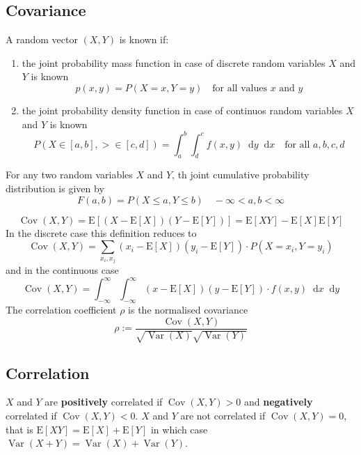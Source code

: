 \documentclass[11pt]{article}
\theoremstyle{definition}
\newcommand*\ev[1]{\mathrel{\text{E}\left[#1\right]}}
\newcommand*\diff{\mathop{}\!\mathrm{d}}
\newcommand*\Cov[1]{\mathop{\text{Cov}}\left(#1\right)}
\newcommand*\Var[1]{\mathop{\text{Var}}\left(#1\right)}
\begin{document}
\subsection{Covariance}
A random vector $(X,Y)$ is known if:
\begin{enumerate}[label=(\alph*)]
	\item the joint probability mass function in case of discrete random variables $X$ and $Y$ is known
	\begin{equation*}
		p(x,y) = P(X=x,Y=y)\quad \text{for all values $x$ and $y$}
	\end{equation*}
	\item the joint probability density function in case of continuos random variables $X$ and $Y$ is known
	\begin{equation*}
		P(X\in [a,b], >\in [c,d]) = \int_{a}^{b}\int_{d}^{c} f(x,y)\diff y\diff x\quad \text{for all } a,b,c,d
	\end{equation*}
\end{enumerate}
For any two random variables $X$ and $Y$, th joint cumulative probability distribution is given by
\begin{equation*}
	F(a,b) = P(X\leq a, Y\leq b)\quad -\infty < a, b<\infty
\end{equation*}

\begin{equation*}
	\Cov{X,Y} = \ev{(X-\ev{X})(Y-\ev{Y})} = \ev{XY} - \ev{X}\ev{Y}
\end{equation*}
In the discrete case this definition reduces to
\begin{equation*}
	\Cov{X,Y} = \sum_{x_i,x_j} (x_i - \ev{X})(y_i - \ev{Y})\cdot P(X=x_i,Y=y_i)
\end{equation*}
and in the continuous case
\begin{equation*}
	\Cov{X,Y} = \int_{-\infty}^{\infty}\int_{-\infty}^{\infty}(x-\ev{X})(y-\ev{Y})\cdot f(x,y)\diff x\diff y
\end{equation*}
The correlation coefficient $\rho$ is the normalised covariance
\begin{equation*}
	\rho := \frac{\Cov{X,Y}}{\sqrt{\Var{X}}\sqrt{\Var{Y}}}
\end{equation*}

\subsection{Correlation}
$X$ and $Y$ are \textbf{positively} correlated if $\Cov{X,Y} > 0$ and \textbf{negatively} correlated if $\Cov{X,Y} < 0$. $X$ and $Y$ are not correlated if $\Cov{X,Y} = 0$, that is $\ev{XY} = \ev{X} + \ev{Y}$ in which case $\Var{X + Y} = \Var{X} + \Var{Y}$.
\end{document}
